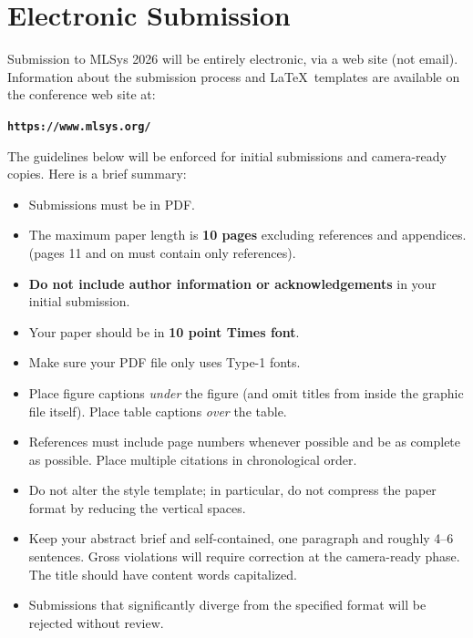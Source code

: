 \documentclass{article}
\begin{document}


\printAffiliationsAndNotice{\mlsysEqualContribution} %

\section{Electronic Submission}
\label{submission}

Submission to MLSys 2026 will be entirely electronic, via a web site
(not email). Information about the submission process and \LaTeX\ templates
are available on the conference web site at:
\begin{center}
\textbf{\texttt{https://www.mlsys.org/}}
\end{center}

The guidelines below will be enforced for initial submissions and
camera-ready copies. Here is a brief summary:
\begin{itemize}
\item Submissions must be in PDF\@.
\item The maximum paper length is \textbf{10 pages} excluding references and appendices.
    (pages 11 and on must contain only references).
\item \textbf{Do not include author information or acknowledgements} in your
    initial submission.
\item Your paper should be in \textbf{10 point Times font}.
\item Make sure your PDF file only uses Type-1 fonts.
\item Place figure captions \emph{under} the figure (and omit titles from inside
    the graphic file itself). Place table captions \emph{over} the table.
\item References must include page numbers whenever possible and be as complete
    as possible. Place multiple citations in chronological order.
\item Do not alter the style template; in particular, do not compress the paper
    format by reducing the vertical spaces.
\item Keep your abstract brief and self-contained, one paragraph and roughly
    4--6 sentences. Gross violations will require correction at the
    camera-ready phase. The title should have content words capitalized.
\item Submissions that significantly diverge from the specified format 
    will be rejected without review.
\end{itemize}
\end{document}
